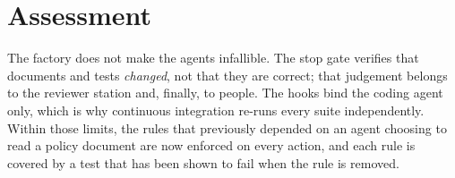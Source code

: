 \documentclass[../main.tex]{subfiles}
\begin{document}
\section{Assessment}
The factory does not make the agents infallible. The stop gate verifies that documents and tests
\emph{changed}, not that they are correct; that judgement belongs to the reviewer station and,
finally, to people. The hooks bind the coding agent only, which is why continuous integration
re-runs every suite independently. Within those limits, the rules that previously depended on an
agent choosing to read a policy document are now enforced on every action, and each rule is
covered by a test that has been shown to fail when the rule is removed.
\end{document}
